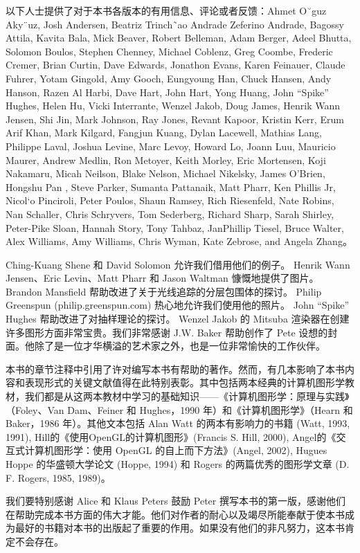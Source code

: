 \documentclass[lang=cn,12pt]{elegantbook}
\begin{document}
以下人士提供了对于本书各版本的有用信息、评论或者反馈：Ahmet O˘guz Aky¨uz, Josh Andersen, Beatriz Trinch˜ao Andrade Zeferino Andrade, Bagossy Attila, Kavita Bala, Mick Beaver, Robert Belleman, Adam Berger, Adeel Bhutta, Solomon Boulos, Stephen Chenney, Michael Coblenz, Greg Coombe, Frederic Cremer, Brian Curtin, Dave Edwards, Jonathon Evans, Karen Feinauer, Claude Fuhrer, Yotam Gingold, Amy Gooch, Eungyoung Han, Chuck Hansen, Andy Hanson, Razen Al Harbi, Dave Hart, John Hart, Yong Huang, John “Spike” Hughes, Helen Hu, Vicki Interrante, Wenzel Jakob, Doug James, Henrik Wann Jensen, Shi Jin, Mark Johnson, Ray Jones, Revant Kapoor, Kristin Kerr, Erum Arif Khan, Mark Kilgard, Fangjun Kuang, Dylan Lacewell, Mathias Lang, Philippe Laval, Joshua Levine, Marc Levoy, Howard Lo, Joann Luu, Mauricio Maurer, Andrew Medlin, Ron Metoyer, Keith Morley, Eric Mortensen, Koji Nakamaru, Micah Neilson, Blake Nelson, Michael Nikelsky, James O’Brien, Hongshu Pan , Steve Parker, Sumanta Pattanaik, Matt Pharr, Ken Phillis Jr, Nicol`o Pinciroli, Peter Poulos, Shaun Ramsey, Rich Riesenfeld, Nate Robins, Nan Schaller, Chris Schryvers, Tom Sederberg, Richard Sharp, Sarah Shirley, Peter-Pike Sloan, Hannah Story, Tony Tahbaz, JanPhillip Tiesel, Bruce Walter, Alex Williams, Amy Williams, Chris Wyman, Kate Zebrose, and Angela Zhang。

Ching-Kuang Shene 和 David Solomon 允许我们借用他们的例子。 Henrik Wann Jensen、Eric Levin、Matt Pharr 和 Jason Waltman 慷慨地提供了图片。 Brandon Mansfield 帮助改进了关于光线追踪的分层包围体的探讨。 Philip Greenspun (philip.greenspun.com) 热心地允许我们使用他的照片。 John “Spike” Hughes 帮助改进了对抽样理论的探讨。 Wenzel Jakob 的 Mitsuba 渲染器在创建许多图形方面非常宝贵。我们非常感谢 J.W. Baker 帮助创作了 Pete 设想的封面。他除了是一位才华横溢的艺术家之外，也是一位非常愉快的工作伙伴。

本书的章节注释中引用了许对编写本书有帮助的著作。然而，有几本影响了本书内容和表现形式的关键文献值得在此特别表彰。其中包括两本经典的计算机图形学教材，我们都是从这两本教材中学习的基础知识——《计算机图形学：原理与实践》（Foley、Van Dam、Feiner 和 Hughes，1990 年）和《计算机图形学》（Hearn 和 Baker，1986 年）。其他文本包括 Alan Watt 的两本有影响力的书籍 (Watt, 1993, 1991), Hill的《使用OpenGL的计算机图形》(Francis S. Hill, 2000), Angel的《交互式计算机图形学：使用 OpenGL 的自上而下方法》(Angel, 2002), Hugues Hoppe 的华盛顿大学论文 (Hoppe, 1994) 和 Rogers 的两篇优秀的图形学文章 (D. F. Rogers, 1985, 1989)。

我们要特别感谢 Alice 和 Klaus Peters 鼓励 Peter 撰写本书的第一版，感谢他们在帮助完成本书方面的伟大才能。他们对作者的耐心以及竭尽所能奉献于使本书成为最好的书籍对本书的出版起了重要的作用。如果没有他们的非凡努力，这本书肯定不会存在。
\end{document}
